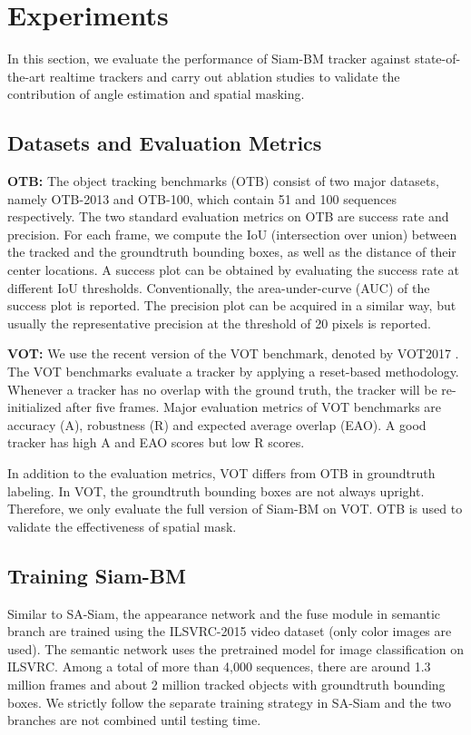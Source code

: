 \documentclass[runningheads]{llncs}
\begin{document}
    
\section{Experiments}
\label{sec:exp}
In this section, we evaluate the performance of Siam-BM tracker against state-of-the-art realtime trackers and carry out ablation studies to validate the contribution of angle estimation and spatial masking.	   


\subsection{Datasets and Evaluation Metrics}
    
\textbf{OTB: }The object tracking benchmarks (OTB) \cite{OTB13,OTB15} consist of two major datasets, namely OTB-2013 and OTB-100, which contain 51 and 100 sequences respectively. The two standard evaluation metrics on OTB are success rate and precision. For each frame, we compute the IoU (intersection over union) between the tracked and the groundtruth bounding boxes, as well as the distance of their center locations. A success plot can be obtained by evaluating the success rate at different IoU thresholds. Conventionally, the area-under-curve (AUC) of the success plot is reported. The precision plot can be acquired in a similar way, but usually the representative precision at the threshold of 20 pixels is reported. 
	    
\textbf{VOT:} We use the recent version of the VOT benchmark, denoted by VOT2017 \cite{VOT2017}. The VOT benchmarks evaluate a tracker by applying a reset-based methodology. Whenever a tracker has no overlap with the ground truth, the tracker will be re-initialized after five frames. Major evaluation metrics of VOT benchmarks are accuracy (A), robustness (R) and expected average overlap (EAO). A good tracker has high A and EAO scores but low R scores. 
    
In addition to the evaluation metrics, VOT differs from OTB in groundtruth labeling. In VOT, the groundtruth bounding boxes are not always upright. Therefore, we only evaluate the full version of Siam-BM on VOT. OTB is used to validate the effectiveness of spatial mask. 

\subsection{Training Siam-BM}
    
Similar to SA-Siam, the appearance network and the fuse module in semantic branch are trained using the ILSVRC-2015 video dataset (only color images are used). The semantic network uses the pretrained model for image classification on ILSVRC. Among a total of more than 4,000 sequences, there are around 1.3 million frames and about 2 million tracked objects with groundtruth bounding boxes. We strictly follow the separate training strategy in SA-Siam and the two branches are not combined until testing time. 
\end{document}
